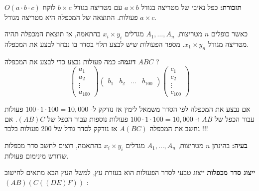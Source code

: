 \textbf{תזכורת:}
כפל נאיבי של מטריצה בגודל 
$a \times b$
עם מטריצה בגודל 
$b \times c$
לוקח 
$O(a \cdot b \cdot c)$
פעולות.
התוצאה של המכפלה היא מטריצה מגודל 
$a \times c$.

כאשר כופלים $n$ מטריצות, 
$A_1,\ldots,A_n$
מגדלים 
$x_i \times y_i$
בהתאמה, אז תוצאת המכפלה תהיה מטריצה מגודל
$x_1 \times y_n$.
מספר הפעולות שיש לבצע תלוי בסדר בו נבחר לבצע את המכפלה.

\textbf{דוגמה:}
כמה פעולות נבצע כדי לבצע את המכפלה
$ABC$
?
$$
\begin{pmatrix}
a_{1}
\\
a_{2}
\\
\vdots
\\
a_{100}
\end{pmatrix}
%
\begin{pmatrix}
b_{1}	&	b_{2} & \dots &  b_{100}
\end{pmatrix}
%
\begin{pmatrix}
c_{1}
\\
c_{2}
\\
\vdots
\\
c_{100}
\end{pmatrix}
$$

אם נבצע את המכפלה לפי הסדר משמאל לימין אז נזדקק ל-%
$100 \cdot 1 \cdot 100 = 10,000$
פעולות עבור הכפל של 
$AB$
ו-%
$100 \cdot 1 \cdot 100 = 10,000$
פעולות נוספות עבור הכפל של
$(AB)C$.
אם נחשב את המכפלה
$A(BC)$
אז נזדקק לסדר גודל של 200 פעולות בלבד !!!

\textbf{בעיה:}
בהינתן $n$ מטריצות, 
$A_1,\ldots,A_n$
מגדלים 
$x_i \times y_i$
בהתאמה, רוצים לחשב סדר מכפלות שדורש מינימום פעולות.

\textbf{ייצוג סדר מכפלות}
ייצוג טבעי לסדר הפעולות הוא בעזרת עץ, למשל העץ הבא מתאים לחישוב
$(AB)(C((DE)F))$
:
\begin{center}
\end{center}




